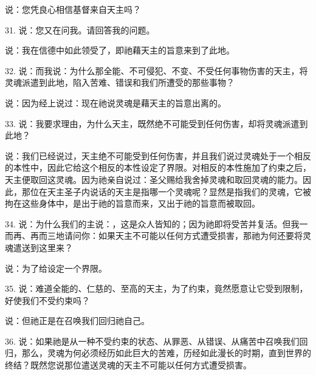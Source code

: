 说：您凭良心相信基督来自天主吗？\par

31. 说：您又在问我。请回答我的问题。\par

说：我在信德中如此领受了，即祂藉天主的旨意来到了此地。\par

32. 说：而我说：为什么那全能、不可侵犯、不变、不受任何事物伤害的天主，将灵魂派遣到此地，陷入苦难、错误和我们所遭受的那些事物？\par

说：因为经上说过：现在祂说灵魂是藉天主的旨意出离的。\par

33. 说：我要求理由，为什么天主，既然绝不可能受到任何伤害，却将灵魂派遣到此地？\par

说：我们已经说过，天主绝不可能受到任何伤害，并且我们说过灵魂处于一个相反的本性中，因此它给这个相反的本性设定了界限。对相反的本性施加了约束之后，天主便取回这灵魂。因为祂亲自说过：圣父赐给我舍掉灵魂和取回灵魂的能力。因此，那位在天主圣子内说话的天主是指哪一个灵魂呢？显然是指我们的灵魂，它被拘在这些身体中，是出于祂的旨意而来，又出于祂的旨意而被取回。\par

34. 说：为什么我们的主说：，这是众人皆知的；因为祂即将受苦并复活。但我一而再、再而三地请问你：如果天主不可能以任何方式遭受损害，那祂为何还要将灵魂遣送到这里来？\par

说：为了给设定一个界限。\par

35. 说：难道全能的、仁慈的、至高的天主，为了约束，竟然愿意让它受到限制，好使我们不受约束吗？\par

说：但祂正是在召唤我们回归祂自己。\par

36. 说：如果祂是从一种不受约束的状态、从罪恶、从错误、从痛苦中召唤我们回归，那么，灵魂为何必须经历如此巨大的苦难，历经如此漫长的时期，直到世界的终结？既然您说那位遣送灵魂的天主不可能以任何方式遭受损害。\par

